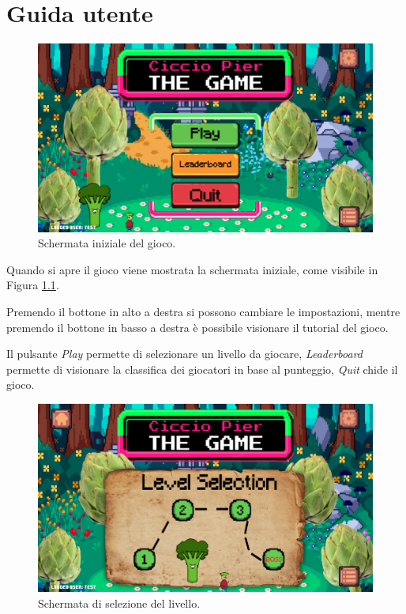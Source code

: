 \documentclass[a4paper,12pt]{report}
\begin{document}
    \appendix
    \chapter{Guida utente}

    \begin{figure}[H]
        \centering{}
        \includegraphics[scale=0.2] {img/game-menu.png}
        \caption{Schermata iniziale del gioco.}
        \label{img:game-menu}
    \end{figure}

    Quando si apre il gioco viene mostrata la schermata iniziale, come visibile in Figura \ref{img:game-menu}.

    Premendo il bottone in alto a destra si possono cambiare le impostazioni, mentre premendo il bottone in basso a destra è possibile visionare il tutorial del gioco.

    Il pulsante \emph{Play} permette di selezionare un livello da giocare, \emph{Leaderboard} permette di visionare la classifica dei giocatori in base al punteggio, \emph{Quit} chide il gioco.

    \begin{figure}[H]
        \centering{}
        \includegraphics[scale=0.2] {img/game-selection.png}
        \caption{Schermata di selezione del livello.}
        \label{img:game-selection}
    \end{figure}
\end{document}
